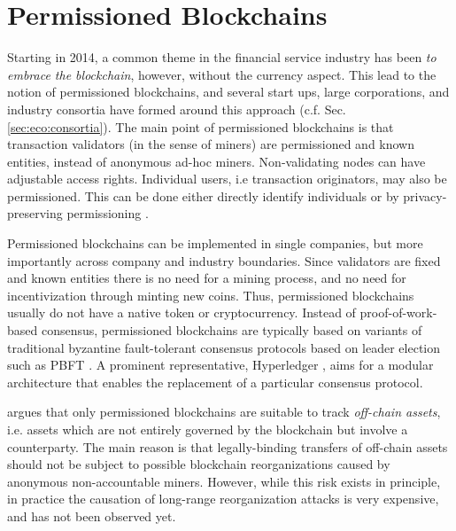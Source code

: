 \section{Permissioned Blockchains}

Starting in 2014, a common theme in the financial service industry has been \emph{to embrace the blockchain}, however, without the currency aspect. This lead to the notion of permissioned blockchains, and several start ups, large corporations, and industry consortia have formed around this approach (c.f. Sec. \ref{sec:eco:consortia}). The main point of permissioned blockchains is that transaction validators (in the sense of miners) are permissioned and known entities, instead of anonymous ad-hoc miners. Non-validating nodes can have adjustable access rights. Individual users, i.e transaction originators, may also be permissioned. This can be done either directly identify individuals or by privacy-preserving permissioning \parencite{hardjono2016chain,Hardjono:2016:CCC:2899007.2899012}.

Permissioned blockchains can be implemented in single companies, but more importantly across company and industry boundaries. Since validators are fixed and known entities there is no need for a mining process, and no need for incentivization through minting new coins. Thus, permissioned blockchains usually do not have a native token or cryptocurrency. Instead of proof-of-work-based consensus, permissioned blockchains are typically based on variants of traditional byzantine fault-tolerant consensus protocols based on leader election such as \ac{PBFT} \parencite{castro1999practical}. A prominent representative, Hyperledger \parencite{cachin2016architecture}, aims for a modular architecture that enables the replacement of a particular consensus protocol.

\cite{swanson2015consensus} argues that only permissioned blockchains are suitable to track \emph{off-chain assets}, i.e. assets which are not entirely governed by the blockchain but involve a counterparty. The main reason is that legally-binding transfers of off-chain assets should not be subject to possible blockchain reorganizations caused by anonymous non-accountable miners. However, while this risk exists in principle, in practice the causation of long-range reorganization attacks is very expensive, and has not been observed yet.


